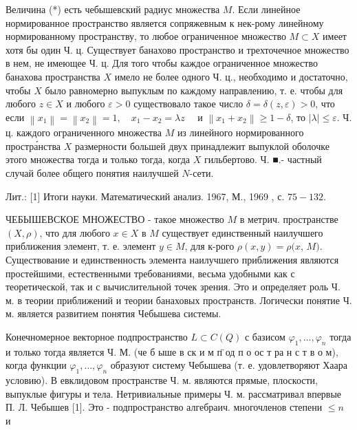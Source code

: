 \documentclass[10pt]{article}
\begin{document}
Величина (*) есть чебышевский радиус множества $M$. Если линейное нормированное пространство является сопряжевным к нек-рому линейному нормированному пространству, то любое ограниченное множество $M \subset X$ имеет хотя бы один Ч. ц. Существует банахово пространство и трехточечное множество в нем, не имеющее Ч. ц. Для того чтобы каждое ограниченное множество банахова пространства $X$ имело не более одного Ч. ц., необходимо и достаточно, чтобы $X$ было равномерно выпуклым по каждому направлению, т. е. чтобы для любого $z \in X$ и любого $\varepsilon>0$ существовало такое число $\delta=\delta(z, \varepsilon)>0$, что если $\left\|x_{1}\right\|=\left\|x_{2}\right\|=1, \quad x_{1}-x_{2}=\lambda z \quad$ и $\left\|x_{1}+x_{2}\right\| \geqslant 1-\delta$, то $|\lambda| \leqslant \varepsilon$. Ч. ц. каждого ограниченного множества $M$ из линейного нормированного простра́нства $X$ размерности большей двух принадлежит выпуклой оболочке этого множества тогда и только тогда, когда $X$ гильбертово. Ч. ■.- частный случай более общего понятия наилучшей $N$-сети.



Лит.: [1] Итоги науки. Математический анализ. 1967, М., 1969 , с. $75-132$.



ЧЕБЫШЕВСКОЕ МНОЖЕСТВО - такое множество $M$ в метрич. пространстве $(X, \rho)$, что для любого $x \in X$ в $M$ существует единственный наилучшего приближения элемент, т. е. элемент $y \in M$, для к-рого $\rho(x, y)=\rho(x$, $M)$. Существование и единственность элемента наилучшего приближения являются простейшими, естественными требованиями, весьма удобными как с теоретической, так и с вычислительной точек зрения. Это и определяет роль Ч. м. в теории приближений и теории банаховых пространств. Логически понятие Ч. м. является развитием понятия Чебышева системы.



Конечномерное векторное подпространство $L \subset C(Q)$ с базисом $\varphi_{1}, \ldots, \varphi_{n}$ тогда и только тогда является Ч. М. (че б ыше в ск и м п̈ од п о ос т ра н с т в о м), когда функции $\varphi_{1}, \ldots, \varphi_{n}$ образуют систему Чебышева (т. е. удовлетворяют Хаара условию). В евклидовом пространстве Ч. м. являются прямые, плоскости, выпуклые фигуры и тела. Нетривиальные примеры Ч. м. рассматривал впервые П. Л. Чебышев [1]. Это - подпространство алгебраич. многочленов степени $\leqslant n$ и
\end{document}
